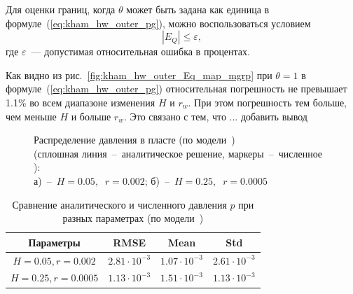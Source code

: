 \documentclass{article}
\begin{document}
Для оценки границ, когда $\theta$ может быть задана как единица в формуле~(\ref{eq:kham_hw_outer_pg}), можно воспользоваться условием
\begin{equation*}
|E_Q| \leq \varepsilon,
\end{equation*}
где $\varepsilon$~--- допустимая относительная ошибка в процентах.

Как видно из рис.~\ref{fig:kham_hw_outer_Eq_map_mgrp} при $\theta=1$ в формуле~(\ref{eq:kham_hw_outer_pg}) относительная погрешность не превышает 1.1\% во всем диапазоне изменения $H$ и $r_w$. При этом погрешность тем больше, чем меньше $H$ и больше $r_w$. Это связано с тем, что ... {\color{red} добавить вывод}

\begin{figure}[!ht]
\centering
\begin{subfigure}{0.48\textwidth}
\centering

\caption{}
\label{fig:kham_hw_outer_p_worst_pg_mgrp}
\end{subfigure}
\hfill
\begin{subfigure}{0.48\textwidth}
\centering

\caption{}
\label{fig:kham_hw_outer_p_best_pg_mgrp}
\end{subfigure}
\caption{
Распределение давления в пласте (по модели~\cite{lit:kham_mazo_uzku_2015}) \\
(сплошная линия~--~аналитическое решение, маркеры~--~численное ): \\
а)~--~$H = 0.05, \;\; r = 0.002$;
б)~--~$H = 0.25, \;\; r = 0.0005$
}
\label{fig:kham_hw_outer_press_disrt_mgrp}
\end{figure}

\begin{table}[h!]
\centering
\caption{Сравнение аналитического и численного давления $p$ при разных параметрах (по модели~\cite{lit:kham_mazo_uzku_2015})}
\label{tab:kham_hw_outer_p_error_metrics_mgrp}
\begin{tabular}{|c|c|c|c|}
\hline
\textbf{Параметры} & \textbf{RMSE} & \textbf{Mean} & \textbf{Std} \\
\hline
$H=0.05, r=0.002$ & $2.81 \cdot 10^{-3}$ & $1.07 \cdot 10^{-3}$ & $2.61 \cdot 10^{-3}$ \\
\hline
$H=0.25, r=0.0005$ & $1.13 \cdot 10^{-3}$ & $1.51 \cdot 10^{-3}$ & $1.13 \cdot 10^{-3}$ \\
\hline
\end{tabular}
\end{table}
\end{document}
